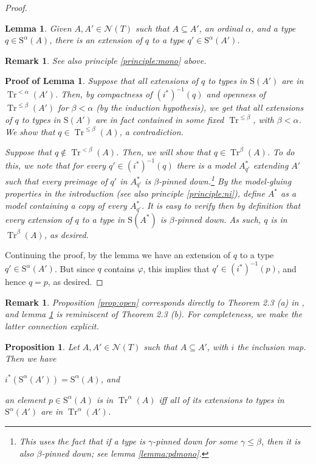 \documentclass{article}
\newtheorem{prop}[theorem]{Proposition}
\newtheorem{lemma}[theorem]{Lemma}
\newtheorem{remark}[theorem]{Remark}
\theoremstyle{nonumberplain}
\newtheorem{proof}{Proof}
\newtheorem{lemmaproof}{Proof of Lemma}
\newcommand{\calN}{\mathcal{N}}
\newcommand{\Stone}{\mathrm{S}}
\DeclareMathOperator{\Tr}{Tr}
\begin{document}
\begin{proof}
\begin{lemma}\label{lemma:ext}
Given $A, A' \in \calN(T)$ such that $A \subseteq A'$, an ordinal $\alpha$, and a type $q \in \Stone^\alpha(A)$, there is an extension of $q$ to a type $q' \in \Stone^\alpha(A')$.
\end{lemma}

\begin{remark}
See also principle \ref{principle:mono} above.
\end{remark}

\begin{lemmaproof}
Suppose that all extensions of $q$ to types in $\Stone(A')$ are in $\Tr^{<\alpha}(A')$. Then, by compactness of $(i^*)^{-1}(q)$ and openness of $\Tr^{\leq \beta}(A')$ for $\beta < \alpha$ (by the induction hypothesis), we get that all extensions of $q$ to types in $\Stone(A')$ are in fact contained in some fixed $\Tr^{\leq \beta}$, with $\beta < \alpha$. We show that $q \in \Tr^{\leq \beta}(A)$, a contradiction.

Suppose that $q \not\in \Tr^{<\beta}(A)$. Then, we will show that $q \in \Tr^\beta(A)$. To do this, we note that for every $q' \in (i^*)^{-1}(q)$ there is a model $A^*_{q'}$ extending $A'$ such that every preimage of $q'$ in $A^*_{q'}$ is $\beta$-pinned down.\footnote{This uses the fact that if a type is $\gamma$-pinned down for some $\gamma \leq \beta$, then it is also $\beta$-pinned down; see lemma \ref{lemma:pdmono}.} By the model-gluing properties in the introduction (see also principle \ref{principle:ni}), define $A^*$ as a model containing a copy of every $A^*_{q'}$. It is easy to verify then by definition that every extension of $q$ to a type in $\Stone(A^*)$ is $\beta$-pinned down. As such, $q$ is in $\Tr^\beta(A)$, as desired.
\end{lemmaproof}

Continuing the proof, by the lemma we have an extension of $q$ to a type $q' \in \Stone^\alpha(A')$. But since $q$ contains $\varphi$, this implies that $q' \in (i^*)^{-1}(p)$, and hence $q = p$, as desired.
\end{proof}

\begin{remark}
Proposition \ref{prop:open} corresponds directly to Theorem 2.3 (a) in \cite{morley}, and lemma \ref{lemma:ext} is reminiscent of Theorem 2.3 (b). For completeness, we make the latter connection explicit.
\end{remark}

\begin{prop}\label{prop:istone}
Let $A, A' \in \calN(T)$ such that $A \subseteq A'$, with $i$ the inclusion map. Then we have \begin{enumerate*} \item\label{item:1} $i^*(\Stone^\alpha(A')) = \Stone^\alpha(A)$, and \item\label{item:2} an element $p \in \Stone^\alpha(A)$ is in $\Tr^\alpha(A)$ iff all of its extensions to types in $\Stone^\alpha(A')$ are in $\Tr^\alpha(A')$.\end{enumerate*}
\end{prop}
\end{document}

